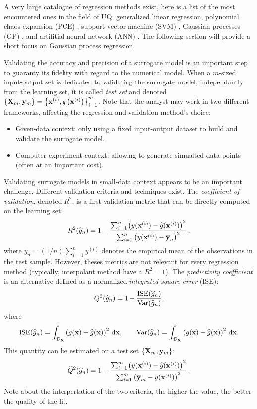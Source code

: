 A very large catalogue of regression methods exist, here is a list of the most encountered ones in the field of UQ:
generalized linear regression, polynomial chaos expansion (PCE) \citep{soize_2004, blatman_2011}, support vector machine (SVM) \citep{vapnik_1995}, 
Gaussian processes (GP) \citep{rasmussen_2006}, and artifitial neural network (ANN) .
The following section will provide a short focus on Gaussian process regression.

Validating the accuracy and precision of a surrogate model is an important step to guaranty its fidelity with regard to the numerical model. 
When a $m$-sized input-output set is dedicated to validating the surrogate model, independantly from the learning set, 
it is called \textit{test set} and denoted $\left\{{\bf X}_m, {\bf y}_m\right\} = \left\{{\bf x}^{(i)}, g\left({\bf x}^{(i)}\right)\right\}_{i=1}^m$. 
Note that the analyst may work in two different frameworks, affecting the regression and validation method's choice: 
\begin{itemize}
    \item Given-data context: only using a fixed input-output dataset to build and validate the surrogate model. 
    \item Computer experiment context: allowing to generate simualted data points (often at an important cost).
\end{itemize}

Validating surrogate models in small-data context appears to be an important challenge. 
Different validation criteria and techniques exist. 
The \textit{coefficient of validation}, denoted $R^2$, is a first validation metric that can be directly computed on the learning set:
\begin{equation}
    R^2(\widehat{g}_n) = 1 - \frac{ \sum_{i=1}^n  \left(y({\bf x}^{(i)}) - \widehat{g}({\bf x}^{(i)})\right)^2}{\sum_{i=1}^n \left(y({\bf x}^{(i)})-\overline{{\bf y}}_n\right)^2}\,,
\end{equation}
where $\overline{y}_n=(1/n)\,\sum_{i=1}^n y^{(i)}$ denotes the empirical mean of the observations in the test sample. 
However, theses metrics are not relevant for every regression method (typically, interpolant method have a $R^2=1$). 
The \textit{predictivity coefficient} is an alternative defined as a normalized \textit{integrated square error} (ISE): 
\begin{equation}
    Q^2(\widehat{g}_n) = 1 - \frac{\mathrm{ISE}(\widehat{g}_n)}{\operatorname{Var}(\widehat{g}_n)}, 
\end{equation} 
where 
\begin{equation}
    \mathrm{ISE}(\widehat{g}_n) = \int_{\mathcal{D}_{{\bf X}}} \left(g({\bf x}) - \widehat{g}({\bf x})\right)^2 \, \mathrm{d}{\bf x}, \qquad
    \operatorname{Var}(\widehat{g}_n) = \int_{\mathcal{D}_{{\bf X}}} \left(g({\bf x}) - \widehat{g}({\bf x})\right)^2 \, \mathrm{d}{\bf x}.
\end{equation}
This quantity can be estimated on a test set $\left\{{\bf X}_m, {\bf y}_m\right\}$: 
\begin{equation}
    \widehat{Q}^2(\widehat{g}_n) = 1 - \frac{ \sum_{i=1}^m  \left(y({\bf x}^{(i)}) - \widehat{g}({\bf x}^{(i)})\right)^2}{\sum_{i=1}^m \left(\overline{{\bf y}}_m - y({\bf x}^{(i)})\right)^2}\,.
\end{equation}
Note about the interpertation of the two criteria, the higher the value, the better the quality of the fit. 

